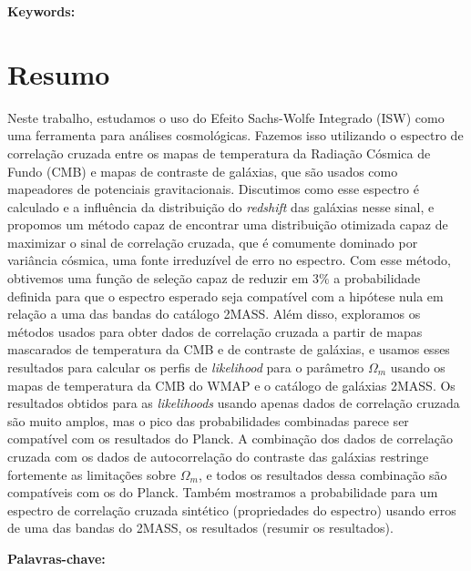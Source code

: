 \documentclass[openany,a4paper,12pt,oneside]{book}
\begin{document}
\vspace{1cm}

\noindent \textbf{Keywords:}

\chapter*{Resumo}

Neste trabalho, estudamos o uso do Efeito Sachs-Wolfe Integrado (ISW) como uma ferramenta para análises cosmológicas. Fazemos isso utilizando o espectro de correlação cruzada entre os mapas de temperatura da Radiação Cósmica de Fundo (CMB) e mapas de contraste de galáxias, que são usados como mapeadores de potenciais gravitacionais. Discutimos como esse espectro é calculado e a influência da distribuição do \textit{redshift} das galáxias nesse sinal, e propomos um método capaz de encontrar uma distribuição otimizada capaz de maximizar o sinal de correlação cruzada, que é comumente dominado por variância cósmica, uma fonte irreduzível de erro no espectro. Com esse método, obtivemos uma função de seleção capaz de reduzir em $3\%$ a probabilidade definida para que o espectro esperado seja compatível com a hipótese nula em relação a uma das bandas do catálogo 2MASS. Além disso, exploramos os métodos usados para obter dados de correlação cruzada a partir de mapas mascarados de temperatura da CMB e de contraste de galáxias, e usamos esses resultados para calcular os perfis de \textit{likelihood} para o parâmetro $\Omega_m$ usando os mapas de temperatura da CMB do WMAP e o catálogo de galáxias 2MASS. Os resultados obtidos para as \textit{likelihoods} usando apenas dados de correlação cruzada são muito amplos, mas o pico das probabilidades combinadas parece ser compatível com os resultados do Planck. A combinação dos dados de correlação cruzada com os dados de autocorrelação do contraste das galáxias restringe fortemente as limitações sobre $\Omega_m$, e todos os resultados dessa combinação são compatíveis com os do Planck. Também mostramos a probabilidade para um espectro de correlação cruzada sintético (propriedades do espectro) usando erros de uma das bandas do 2MASS, os resultados (resumir os resultados).

\vspace{1cm}

\noindent \textbf{Palavras-chave:}

\end{document}
